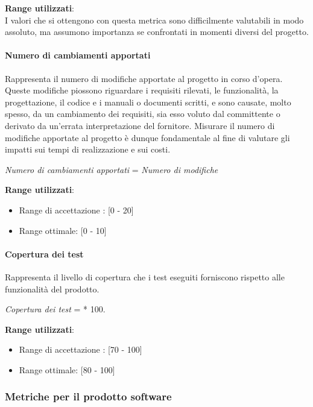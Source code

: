 \textbf{Range utilizzati}: \\
I valori che si ottengono con questa metrica sono difficilmente valutabili in modo assoluto, ma assumono importanza se confrontati in momenti diversi del progetto.

\paragraph{Numero di cambiamenti apportati}
Rappresenta il numero di modifiche apportate al progetto in corso d'opera. Queste modifiche piossono riguardare i requisiti rilevati, le funzionalit\`a, la progettazione, il codice e i manuali o documenti scritti, e sono causate, molto spesso, da un cambiamento dei requisiti, sia esso voluto dal committente o derivato da un'errata interpretazione del fornitore. Misurare il numero di modifiche apportate al progetto \`e dunque fondamentale al fine di valutare gli impatti sui tempi di realizzazione e sui costi.
\begin{center}
	\textit{Numero di cambiamenti apportati} = \textit{Numero di modifiche}
\end{center}
\textbf{Range utilizzati}:
\begin{itemize}
	\item Range di accettazione : [0 - 20]
	\item Range ottimale: [0 - 10]
\end{itemize}

\paragraph{Copertura dei test}
Rappresenta il livello di copertura che i test eseguiti forniscono rispetto alle funzionalit\`a del prodotto. \\
\begin{center}
	\textit{Copertura dei test} =  100.
\end{center}
\textbf{Range utilizzati}:
\begin{itemize}
	\item Range di accettazione : [70 - 100]
	\item Range ottimale: [80 - 100]
\end{itemize}

\subsubsection{Metriche per il prodotto software}

